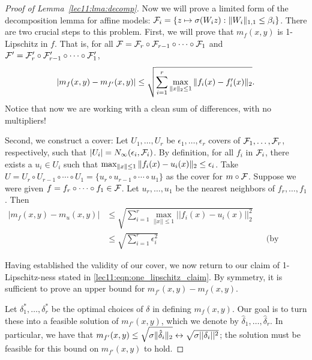 \begin{proof}[Proof of Lemma~\ref{lec11:lma:decomp}]
Now we will prove a limited form of the decomposition lemma for affine models: $\mathcal F_i = \{ z \mapsto \sigma(W_i z): \|W_i\|_{1, 1} \leq \beta_i \}$. There are two crucial steps to this problem. First, we will prove that $m_f(x, y)$ is 1-Lipschitz in $f$. That is, for all $\mathcal F = \mathcal F_r \circ \mathcal F_{r-1} \circ \cdots \circ \mathcal F_1$ and $\mathcal F' = \mathcal F_r' \circ 
\mathcal F_{r-1}' \circ \cdots \circ \mathcal F_1'$,
\begin{align}
    \left\lvert m_f(x, y) - m_{f'}(x, y)\right\rvert \leq \sqrt{\sum_{i=1}^r \max_{\|x\|_2 \leq 1} \|f_i(x) - f_i'(x)\|_2}. \label{lec11:eqn:one_lipschitz_claim}
\end{align}
Notice that now we are working with a clean sum of differences, with no multipliers! 

Second, we construct a cover: Let $U_1, \dots, U_r$ be $\epsilon_1, \dots, \epsilon_r$ covers of $\mathcal F_1, \dots, \mathcal F_r$, respectively, such that $\left\lvert U_i\right\rvert = N_\infty(\epsilon_i, \mathcal F_i)$. By definition, for all $f_i$ in $\mathcal F_i$, there exists a $u_i \in U_i$ such that $\max_{\|x\| \leq 1} \|f_i(x) - u_i(x)\|_2 \leq \epsilon_i$. Take $U = U_r \circ U_{r-1} \circ \cdots \circ U_1 = \{u_r \circ u_{r-1} \circ \cdots \circ u_1 \}$ as the cover for $m \circ \mathcal F$. Suppose we were given $f = f_r \circ \cdots \circ f_1 \in \mathcal F$. Let $u_r, \dots, u_1$ be the nearest neighbors of $f_r, \dots, f_1$. Then
\begin{align}
|m_f(x, y) - m_u(x, y)| &\leq \sqrt{\sum_{i=1}^r \max_{||x|| \leq 1} ||f_i(x) - u_i(x)||_2^2} \\
&\leq \sqrt{\sum_{i=1}^r \epsilon_i^2} &&\text{(by construction).}
\end{align}

Having established the validity of our cover, we now return to our claim of 1-Lipschitz-ness stated in \eqref{lec11:eqn:one_lipschitz_claim}. By symmetry, it is sufficient to prove an upper bound for $m_{f'}(x, y) - m_f(x, y)$.

Let $\delta_1^*, \dots, \delta_r^*$ be the optimal choices of $\delta$ in defining $m_f(x, y)$. Our goal is to turn these into a feasible solution of $m_{f'}(x, y)$, which we denote by $\hat{\delta}_1, \dots, \hat{\delta}_r$. In particular, we have that $m_{f'}(x, y) \leq \sqrt{\sigma \|\hat{\delta}_i\|_2} \leftrightarrow \sqrt{\sigma||\delta_i||^2}$; the solution must be feasible for this bound on $m_{f'}(x, y)$ to hold.


\end{proof}
